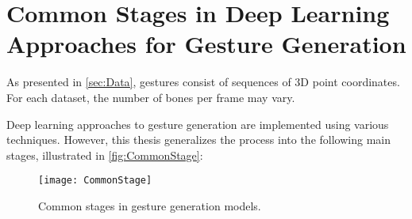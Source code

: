 \section{Common Stages in Deep Learning Approaches for Gesture Generation}
\label{sec:commonstage}

As presented in \autoref{sec:Data}, gestures consist of sequences of 3D point coordinates. For each dataset, the number of bones per frame may vary.

Deep learning approaches to gesture generation are implemented using various techniques. However, this thesis generalizes the process into the following main stages, illustrated in \autoref{fig:CommonStage}:

\begin{figure}[h]
	\centering
	\texttt{[image: CommonStage]}
	\caption{Common stages in gesture generation models.}
	\label{fig:CommonStage}
\end{figure}

